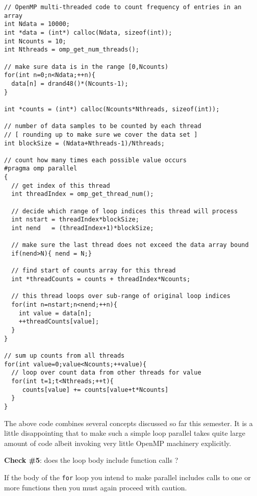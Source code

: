 \newpage
\begin{verbatim}
// OpenMP multi-threaded code to count frequency of entries in an array 
int Ndata = 10000;
int *data = (int*) calloc(Ndata, sizeof(int));
int Ncounts = 10;
int Nthreads = omp_get_num_threads();

// make sure data is in the range [0,Ncounts)
for(int n=0;n<Ndata;++n){
  data[n] = drand48()*(Ncounts-1);
}

int *counts = (int*) calloc(Ncounts*Nthreads, sizeof(int));

// number of data samples to be counted by each thread
// [ rounding up to make sure we cover the data set ]
int blockSize = (Ndata+Nthreads-1)/Nthreads;
  
// count how many times each possible value occurs
#pragma omp parallel
{
  // get index of this thread
  int threadIndex = omp_get_thread_num();

  // decide which range of loop indices this thread will process
  int nstart = threadIndex*blockSize;
  int nend   = (threadIndex+1)*blockSize;
  
  // make sure the last thread does not exceed the data array bound 
  if(nend>N){ nend = N;}
  
  // find start of counts array for this thread
  int *threadCounts = counts + threadIndex*Ncounts;
  
  // this thread loops over sub-range of original loop indices
  for(int n=nstart;n<nend;++n){
    int value = data[n];
    ++threadCounts[value];
  }  
}

// sum up counts from all threads
for(int value=0;value<Ncounts;++value){
  // loop over count data from other threads for value
  for(int t=1;t<Nthreads;++t){
     counts[value] += counts[value+t*Ncounts]
  }
}
\end{verbatim}
The above code combines several concepts discussed so far this semester. It is a little disappointing that to make such a simple loop parallel takes quite large amount of code albeit invoking very little OpenMP machinery explicitly.

{\bf Check \#5}: does the loop body include function calls ?

If the body of the \texttt{for} loop you intend to make parallel includes calls to one or more functions then you must again proceed with caution.

